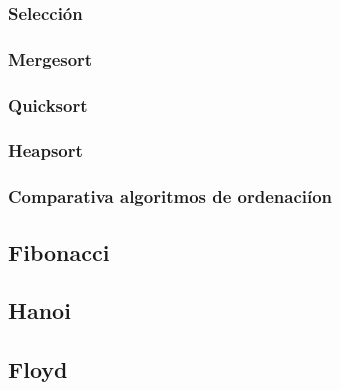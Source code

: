 \documentclass[11pt,spanish]{article} %
\begin{document}
\subsubsection{Selecci\'on}
\subsubsection{Mergesort}
\subsubsection{Quicksort}
\subsubsection{Heapsort}
\subsubsection{Comparativa algoritmos de ordenaci\'ion}


\subsection{Fibonacci}
\subsection{Hanoi}
\subsection{Floyd}

\newpage

\end{document}
